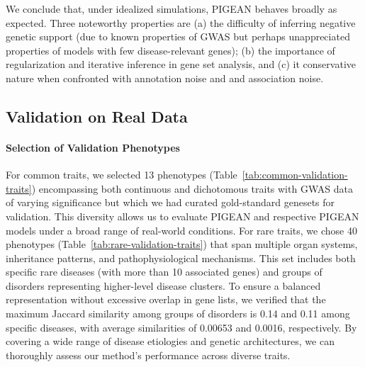 \documentclass[sn-nature,lineno]{sn-jnl}%
\theoremstyle{thmstyleone}%
\theoremstyle{thmstyletwo}%
\theoremstyle{thmstylethree}%
\begin{document}
We conclude that, under idealized simulations, PIGEAN behaves broadly as expected. Three noteworthy properties are (a) the difficulty of inferring negative genetic support (due to known properties of GWAS but perhaps unappreciated properties of models with few disease-relevant genes); (b) the importance of regularization and iterative inference in gene set analysis, and (c) it conservative nature when confronted with annotation noise and and association noise.

\subsection{Validation on Real Data}
\paragraph{Selection of Validation Phenotypes}
For common traits, we selected 13 phenotypes (Table~\ref{tab:common-validation-traits}) encompassing both continuous and dichotomous traits with GWAS data of varying significance but which we had curated gold-standard genesets for validation. This diversity allows us to evaluate PIGEAN and respective PIGEAN models under a broad range of real-world conditions. For rare traits, we chose 40 phenotypes (Table~\ref{tab:rare-validation-traits}) that span multiple organ systems, inheritance patterns, and pathophysiological mechanisms. This set includes both specific rare diseases (with more than 10 associated genes) and groups of disorders representing higher-level disease clusters. To ensure a balanced representation without excessive overlap in gene lists, we verified that the maximum Jaccard similarity among groups of disorders is 0.14 and 0.11 among specific diseases, with average similarities of 0.00653 and 0.0016, respectively. By covering a wide range of disease etiologies and genetic architectures, we can thoroughly assess our method's performance across diverse traits.


\end{document}
